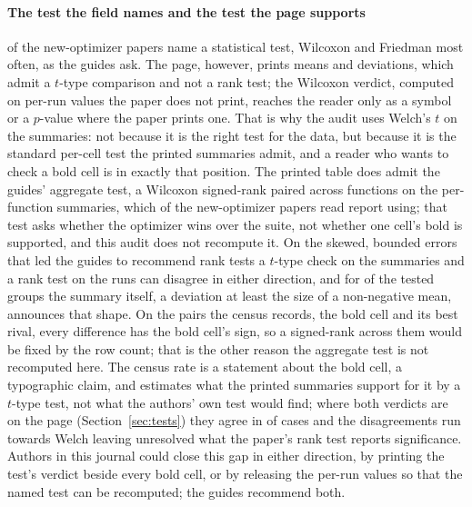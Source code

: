 \documentclass[preprint,review,12pt]{elsarticle}
\begin{document}
\paragraph{The test the field names and the test the page supports} \nSkNewOptimizerPctTestNamed{} of the new-optimizer papers name a statistical test, Wilcoxon and Friedman most often, as the guides ask. The page, however, prints means and deviations, which admit a $t$-type comparison and not a rank test; the Wilcoxon verdict, computed on per-run values the paper does not print, reaches the reader only as a symbol or a $p$-value where the paper prints one. That is why the audit uses Welch's $t$ on the summaries: not because it is the right test for the data, but because it is the standard per-cell test the printed summaries admit, and a reader who wants to check a bold cell is in exactly that position. The printed table does admit the guides' aggregate test, a Wilcoxon signed-rank paired across functions on the per-function summaries, which \nTrNewOptimizerOnPerFunctionMeans{} of the new-optimizer papers read report using; that test asks whether the optimizer wins over the suite, not whether one cell's bold is supported, and this audit does not recompute it. On the skewed, bounded errors that led the guides to recommend rank tests a $t$-type check on the summaries and a rank test on the runs can disagree in either direction, and for \nCrcShPctTestedSdGeMean{} of the tested groups the summary itself, a deviation at least the size of a non-negative mean, announces that shape. On the pairs the census records, the bold cell and its best rival, every difference has the bold cell's sign, so a signed-rank across them would be fixed by the row count; that is the other reason the aggregate test is not recomputed here. The census rate is a statement about the bold cell, a typographic claim, and estimates what the printed summaries support for it by a $t$-type test, not what the authors' own test would find; where both verdicts are on the page (Section~\ref{sec:tests}) they agree in \nVcPctAgree{} of cases and the disagreements run towards Welch leaving unresolved what the paper's rank test reports significance. Authors in this journal could close this gap in either direction, by printing the test's verdict beside every bold cell, or by releasing the per-run values so that the named test can be recomputed; the guides recommend both.
\end{document}
